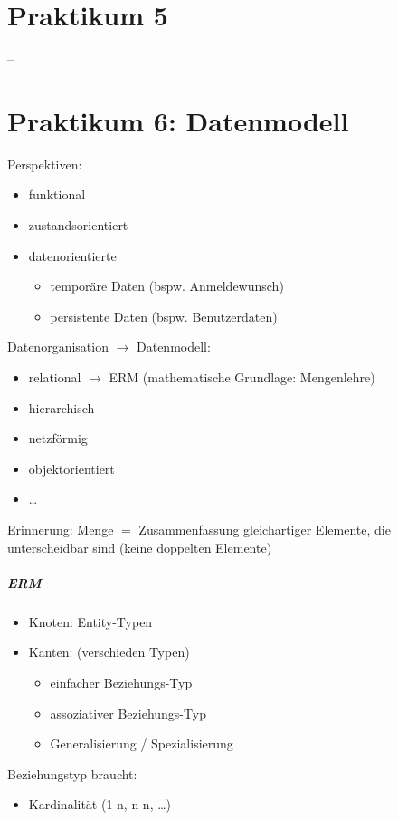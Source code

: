 \chapter{Praktikum 5}
--

\chapter{Praktikum 6: Datenmodell}
Perspektiven:
\begin{itemize}
\item funktional
\item zustandsorientiert
\item datenorientierte
\begin{itemize}
\item temporäre Daten (bspw. Anmeldewunsch)
\item persistente Daten (bspw. Benutzerdaten)
\end{itemize}
\end{itemize}
Datenorganisation $\to$ Datenmodell:
\begin{itemize}
\item relational $\to$ ERM (mathematische Grundlage: Mengenlehre)
\item hierarchisch
\item netzförmig
\item objektorientiert
\item …
\end{itemize}
Erinnerung: Menge $=$ Zusammenfassung gleichartiger Elemente, die unterscheidbar sind (keine doppelten Elemente)
\paragraph{ERM}
\begin{itemize}
\item Knoten: Entity-Typen
\item Kanten: (verschieden Typen)
\begin{itemize}
\item einfacher Beziehungs-Typ
\item assoziativer Beziehungs-Typ
\item Generalisierung / Spezialisierung
\end{itemize}
\end{itemize}
Beziehungstyp braucht: 
\begin{itemize}
\item Kardinalität (1-n, n-n, …)
\end{itemize}










